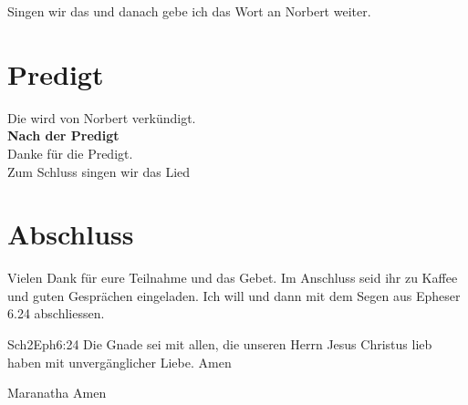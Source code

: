 \documentclass[12pt,a4paper]{scrarticle}
\begin{document}
Singen wir das  und danach gebe ich das Wort an Norbert weiter.

\section{Predigt}
Die wird von Norbert verkündigt.\\

\textbf{Nach der Predigt}\\

Danke für die Predigt.\\

Zum Schluss singen wir das Lied 

\section{Abschluss}
Vielen Dank für eure Teilnahme und das Gebet. Im Anschluss seid ihr zu Kaffee und guten Gesprächen eingeladen.
Ich will \beten{} und dann mit dem Segen aus Epheser 6.24 abschliessen.
\begin{bibeltext}{Sch2}{Eph}{6:24}
Die Gnade sei mit allen, die unseren Herrn Jesus Christus lieb haben mit unvergänglicher Liebe. Amen
\end{bibeltext}
Maranatha Amen
\end{document}
